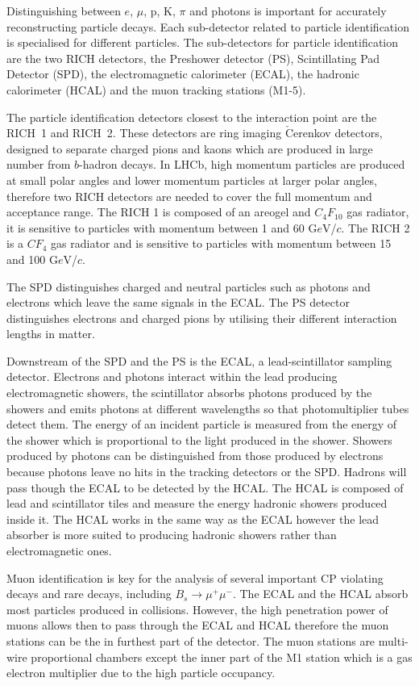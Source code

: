 Distinguishing between $e$, $\mu$, p, K, $\pi$ and photons is important for accurately reconstructing particle decays. Each sub-detector related to particle identification is specialised for
 different particles. The sub-detectors for particle identification are the two RICH detectors, the Preshower detector (PS), Scintillating Pad Detector (SPD), the electromagnetic calorimeter (ECAL), the hadronic calorimeter 
(HCAL) and the muon tracking stations (M1-5). 

The particle identification detectors closest to the interaction point are the RICH~1 and RICH~2. These detectors are ring imaging $\check{\text{C}}$erenkov detectors, designed to separate charged pions and kaons
 which are produced in large number from $b$-hadron decays.  In LHCb, high momentum particles are produced at small polar angles and lower momentum particles at larger polar angles, therefore two RICH 
detectors are needed to cover the full momentum and acceptance range. The RICH 1 is composed of an areogel and $C_{4}F_{10}$ gas radiator, it is sensitive to particles with momentum between  1 and 60 G$e$V/$c$. 
The RICH 2 is a $CF_{4}$ gas radiator and is sensitive to particles with momentum between 15 and 100 G$e$V/$c$. 


The SPD distinguishes charged and neutral particles such as photons and electrons which leave the same signals in the ECAL. The PS detector distinguishes electrons and 
charged pions by utilising their different interaction lengths in matter. 


Downstream of the SPD and the PS is the ECAL, a lead-scintillator sampling detector. Electrons and photons interact within the lead producing electromagnetic showers, the scintillator 
absorbs photons produced by the showers and emits photons at different wavelengths so that photomultiplier tubes detect them. The energy of an incident particle is measured from the energy of the shower which is proportional to the light produced in the shower. Showers produced by photons can be distinguished from those produced by electrons because photons leave no hits 
in the tracking detectors or the SPD. Hadrons will pass though the ECAL to be detected by the HCAL. The HCAL is composed of lead and scintillator tiles and measure the energy 
hadronic showers produced inside it. The HCAL works in the same way as the ECAL however the lead absorber is more suited to producing hadronic showers rather than electromagnetic ones.

Muon identification is key for the analysis of several important CP violating decays and rare decays, including $B_{s} \to \mu^{+} \mu^{-}$. The ECAL and the HCAL absorb most particles produced in collisions. 
However, the high penetration power of muons allows then to pass through the ECAL and HCAL therefore the muon stations can be the in furthest part of the detector.  The muon stations are multi-wire proportional chambers except the inner part of the M1 station which is 
a gas electron multiplier due to the high particle occupancy. 



